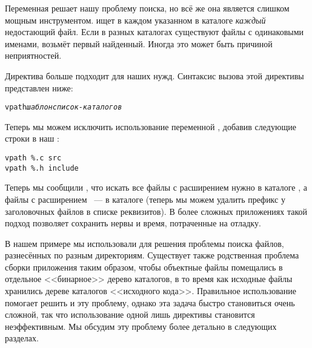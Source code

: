 Переменная  решает нашу проблему поиска, но всё же она
является слишком мощным инструментом. \GNUmake{} ищет в каждом
указанном в  каталоге \emph{каждый} недостающий
файл. Если в разных каталогах существуют файлы с одинаковыми
именами, \GNUmake{} возьмёт первый найденный. Иногда это может быть
причиной неприятностей.

Директива  больше подходит для наших нужд. Синтаксис
вызова этой директивы представлен ниже:

{\footnotesize
\begin{alltt}
vpath \emph{шаблон список-каталогов}
\end{alltt}
}

Теперь мы можем исключить использование переменной ,
добавив следующие строки в наш \Makefile{}:

{\footnotesize
\begin{verbatim}
vpath %.c src
vpath %.h include
\end{verbatim}
}

Теперь мы сообщили \GNUmake{}, что искать все файлы с расширением
 нужно в каталоге , а файлы с расширением
~--- в каталоге  (теперь мы можем
удалить префикс  у заголовочных файлов в списке
реквизитов). В более сложных приложениях такой подход позволяет
сохранить нервы и время, потраченные на отладку.

В нашем примере мы использовали  для решения проблемы
поиска файлов, разнесённых по разным директориям. Существует также
родственная проблема сборки приложения таким образом, чтобы объектные
файлы помещались в отдельное <<бинарное>> дерево каталогов, в то время
как исходные файлы хранились дереве каталогов <<исходного кода>>.
Правильное использование  помогает решить и эту
проблему, однако эта задача быстро становиться очень сложной, так что
использование одной лишь директивы  становится
неэффективным.  Мы обсудим эту проблему более детально в следующих
разделах.
